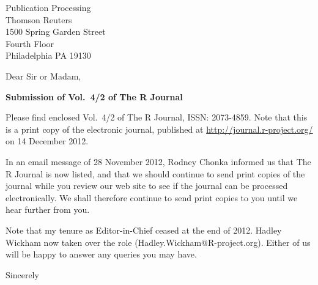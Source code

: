 \documentclass[11pt]{letter}
\begin{document}
\address{12 rue Saint Denis\\69500 Bron\\France\\[12pt]Tel: +33(0)4 72 73 84 46\\Eml: Martyn.Plummer@R-project.org}
\signature{Martyn Plummer\\\textbf{Editor in Chief\\The R Journal}}
\def\today{25 January 2013}

\begin{letter}{Publication Processing \\
      Thomson Reuters\\
      1500 Spring Garden Street\\Fourth Floor\\
      Philadelphia PA 19130}

\opening{Dear Sir or Madam,}

\textbf{Submission of Vol.\ 4/2 of The R Journal}

Please find enclosed Vol.\ 4/2 of The R Journal, ISSN: 2073-4859. Note
that this is a print copy of the electronic journal, published at
\url{http://journal.r-project.org/} on 14 December 2012.

In an email message of 28 November 2012, Rodney Chonka informed us
that The R Journal is now listed, and that we should continue to send
print copies of the journal while you review our web site to see if
the journal can be processed electronically. We shall therefore
continue to send print copies to you until we hear further from you.

Note that my tenure as Editor-in-Chief ceased at the end of 2012.
Hadley Wickham now taken over the role (Hadley.Wickham@R-project.org).
Either of us will be happy to answer any queries you may have.

\closing{Sincerely}

\end{letter}
\end{document}

